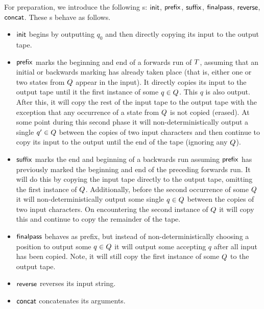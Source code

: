 For preparation, we introduce the following \FT{}s:
    $\mathsf{init}$,
    $\mathsf{prefix}$,
    $\mathsf{suffix}$,
    $\mathsf{finalpass}$,
    $\mathsf{reverse}$,
    $\mathsf{concat}$.
These \FT{}s behave as follows.
\begin{itemize}
\item
    $\mathsf{init}$ begins by outputting $q_0$ and then directly copying its input to
    the output tape.

\item
    $\mathsf{prefix}$ marks the beginning and end of a forwards run of $T$,
    assuming that an initial or backwards marking has already taken place (that
    is, either one or two states from $Q$ appear in the input).
    It directly copies its input to the output tape until it the first instance
    of some
    $q \in Q$.
    This $q$ is also output.
    After this, it will copy the rest of the input tape to the output tape with
    the exception that any occurrence of a state from $Q$ is not copied
    (erased).
    At some point during this second phase it will non-deterministically output
    a single
    $q' \in Q$
    between the copies of two input characters and then continue to copy its
    input to the output until the end of the tape (ignoring any $Q$).

\item
    $\mathsf{suffix}$ marks the end and beginning of a backwards run assuming $\mathsf{prefix}$
    has previously marked the beginning and end of the preceding forwards run.
    It will do this by copying the input tape directly to the output tape,
    omitting the first instance of $Q$.
    Additionally, before the second occurrence of some $Q$ it will
    non-deterministically output some single $q \in Q$ between the
    copies of two input characters.
    On encountering the second instance of $Q$ it will copy this and
    continue to copy the remainder of the tape.

\item
    $\mathsf{finalpass}$ behaves as prefix, but instead of non-deterministically
    choosing a position to output some
    $q \in Q$
    it will output some accepting $q$ after all input has been copied.
    Note, it will still copy the first instance of some $Q$ to the
    output tape.

\item
    $\mathsf{reverse}$ reverses its input string.

\item
    $\mathsf{concat}$ concatenates its arguments.
\end{itemize}

